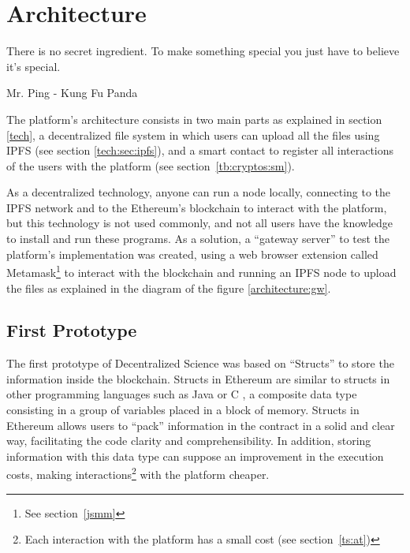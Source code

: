 

\chapter{Architecture}
\label{cha:architecture}
\begin{FraseCelebre}
  \begin{Frase}
    There is no secret ingredient. To make something special you just have to
    believe it's special.
  \end{Frase}
  \begin{Fuente}
    Mr. Ping - Kung Fu Panda
  \end{Fuente}
\end{FraseCelebre}

The platform's architecture consists in two main parts as explained in section
\ref{tech}, a decentralized file system in which users can upload all the files
using IPFS (see section \ref{tech:sec:ipfs}), and a smart contact to register
all interactions of the users with the platform (see
section~\ref{tb:cryptos:sm}).

As a decentralized technology, anyone can run a node locally, connecting to the
IPFS network and to the Ethereum's blockchain to interact with the platform, but
this technology is not used commonly, and not all users have the knowledge to
install and run these programs. As a solution, a ``gateway server'' to test the
platform's implementation was created, using a web browser extension called
Metamask\footnote{See section~\ref{jsmm}} to interact with the blockchain and
running an IPFS node to upload the files as explained in the diagram of the
figure \ref{architecture:gw}.


\section{First Prototype}
\label{sec:first-prototype}

The first prototype of Decentralized Science was based on ``Structs'' to store
the information inside the blockchain. Structs in Ethereum are similar to
structs in other programming languages such as Java or C , a composite data type
consisting in a group of variables placed in a block of memory. Structs in
Ethereum allows users to ``pack'' information in the contract in a solid and
clear way, facilitating the code clarity and comprehensibility. In addition,
storing information with this data type can suppose an improvement in the
execution costs, making interactions\footnote{Each interaction with the platform
  has a small cost (see section~\ref{ts:at})} with the platform cheaper.

